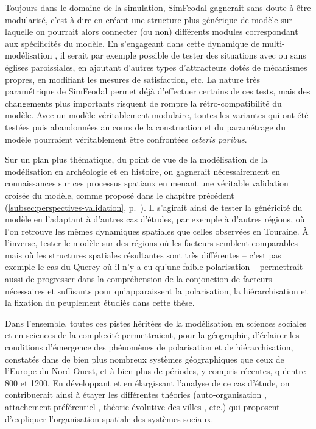 Toujours dans le domaine de la simulation, SimFeodal gagnerait sans doute à être \og modularisé\fg{}, c'est-à-dire en créant une structure plus générique de modèle sur laquelle on pourrait alors connecter (ou non) différents \og modules\fg{} correspondant aux spécificités du modèle.
En s'engageant dans cette dynamique de multi-modélisation \autocite{cottineau_chapter_2019}, il serait par exemple possible de tester des situations avec ou sans églises paroissiales, en ajoutant d'autres types d'attracteurs dotés de mécanismes propres, en modifiant les mesures de satisfaction, etc.
La nature très paramétrique de SimFeodal permet déjà d'effectuer certains de ces tests, mais des changements plus importants risquent de rompre la rétro-compatibilité du modèle.
Avec un modèle véritablement modulaire, toutes les variantes qui ont été testées puis abandonnées au cours de la construction et du paramétrage du modèle pourraient véritablement être confrontées \textit{ceteris paribus}.

Sur un plan plus thématique, du point de vue de la modélisation de la modélisation en archéologie et en histoire, on gagnerait nécessairement en connaissances sur ces processus spatiaux en menant une véritable \og validation croisée\fg{} du modèle, comme proposé dans le chapitre précédent (\cref{subsec:perspectives-validation}, p.~\pageref{par:validation-croisee}).
Il s'agirait ainsi de tester la généricité du modèle en l'adaptant à d'autres cas d'études, par exemple à d'autres régions, où l'on retrouve les mêmes dynamiques spatiales que celles observées en Touraine.
À l'inverse, tester le modèle sur des régions où les facteurs semblent comparables mais où les structures spatiales résultantes sont très différentes -- c'est pas exemple le cas du Quercy où il n'y a eu qu'une faible polarisation -- permettrait aussi de progresser dans la compréhension de la conjonction de facteurs nécessaires et suffisants pour qu'apparaissent la polarisation, la hiérarchisation et la fixation du peuplement étudiés dans cette thèse.

Dans l'ensemble, toutes ces pistes héritées de la modélisation en sciences sociales et en sciences de la complexité permettraient, pour la géographie, d'éclairer les conditions d'émergence des phénomènes de polarisation et de hiérarchisation, constatés dans de bien plus nombreux systèmes géographiques que ceux de l'Europe du Nord-Ouest, et à bien plus de périodes, y compris récentes, qu'entre 800 et 1200.
En développant et en élargissant l'analyse de ce cas d'étude, on contribuerait ainsi à étayer les différentes théories (auto-organisation \autocite{saint1989villes}, attachement préférentiel \autocite{albert_statistical_2002}, théorie évolutive des villes \autocite{pumain_pour_1997}, etc.) qui proposent d'expliquer l'organisation spatiale des systèmes sociaux.

